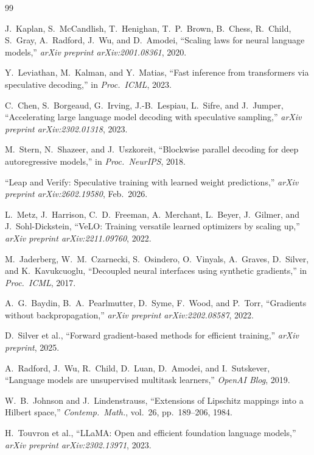 \documentclass[conference]{IEEEtran}
\begin{document}
\begin{thebibliography}{99}

J.\ Kaplan, S.\ McCandlish, T.\ Henighan, T.\ P.\ Brown, B.\ Chess, R.\ Child, S.\ Gray, A.\ Radford, J.\ Wu, and D.\ Amodei, ``Scaling laws for neural language models,'' \textit{arXiv preprint arXiv:2001.08361}, 2020.

Y.\ Leviathan, M.\ Kalman, and Y.\ Matias, ``Fast inference from transformers via speculative decoding,'' in \textit{Proc.\ ICML}, 2023.

C.\ Chen, S.\ Borgeaud, G.\ Irving, J.-B.\ Lespiau, L.\ Sifre, and J.\ Jumper, ``Accelerating large language model decoding with speculative sampling,'' \textit{arXiv preprint arXiv:2302.01318}, 2023.

M.\ Stern, N.\ Shazeer, and J.\ Uszkoreit, ``Blockwise parallel decoding for deep autoregressive models,'' in \textit{Proc.\ NeurIPS}, 2018.

``Leap and Verify: Speculative training with learned weight predictions,'' \textit{arXiv preprint arXiv:2602.19580}, Feb.\ 2026.

L.\ Metz, J.\ Harrison, C.\ D.\ Freeman, A.\ Merchant, L.\ Beyer, J.\ Gilmer, and J.\ Sohl-Dickstein, ``VeLO: Training versatile learned optimizers by scaling up,'' \textit{arXiv preprint arXiv:2211.09760}, 2022.

M.\ Jaderberg, W.\ M.\ Czarnecki, S.\ Osindero, O.\ Vinyals, A.\ Graves, D.\ Silver, and K.\ Kavukcuoglu, ``Decoupled neural interfaces using synthetic gradients,'' in \textit{Proc.\ ICML}, 2017.

A.\ G.\ Baydin, B.\ A.\ Pearlmutter, D.\ Syme, F.\ Wood, and P.\ Torr, ``Gradients without backpropagation,'' \textit{arXiv preprint arXiv:2202.08587}, 2022.

D.\ Silver et al., ``Forward gradient-based methods for efficient training,'' \textit{arXiv preprint}, 2025.

A.\ Radford, J.\ Wu, R.\ Child, D.\ Luan, D.\ Amodei, and I.\ Sutskever, ``Language models are unsupervised multitask learners,'' \textit{OpenAI Blog}, 2019.

W.\ B.\ Johnson and J.\ Lindenstrauss, ``Extensions of Lipschitz mappings into a Hilbert space,'' \textit{Contemp.\ Math.}, vol.\ 26, pp.\ 189--206, 1984.

H.\ Touvron et al., ``LLaMA: Open and efficient foundation language models,'' \textit{arXiv preprint arXiv:2302.13971}, 2023.

\end{thebibliography}
\end{document}

